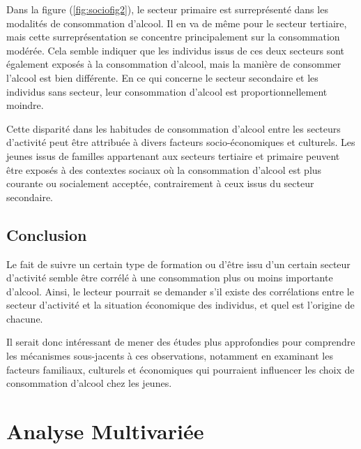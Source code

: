 \documentclass{article}
\begin{document}
Dans la figure (\ref{fig:sociofig2}), le secteur primaire est surreprésenté dans les modalités de consommation d'alcool. Il en va de même pour le secteur tertiaire, mais cette surreprésentation se concentre principalement sur la consommation modérée. Cela semble indiquer que les individus issus de ces deux secteurs sont également exposés à la consommation d'alcool, mais la manière de consommer l'alcool est bien différente. En ce qui concerne le secteur secondaire et les individus sans secteur, leur consommation d'alcool est proportionnellement moindre.

Cette disparité dans les habitudes de consommation d'alcool entre les secteurs d'activité peut être attribuée à divers facteurs socio-économiques et culturels. Les jeunes issus de familles appartenant aux secteurs tertiaire et primaire peuvent être exposés à des contextes sociaux où la consommation d'alcool est plus courante ou socialement acceptée, contrairement à ceux issus du secteur secondaire.

\subsection{Conclusion}
Le fait de suivre un certain type de formation ou d'être issu d'un certain secteur d'activité semble être corrélé à une consommation plus ou moins importante d'alcool. Ainsi, le lecteur pourrait se demander s'il existe des corrélations entre le secteur d'activité et la situation économique des individus, et quel est l'origine de chacune.

Il serait donc intéressant de mener des études plus approfondies pour comprendre les mécanismes sous-jacents à ces observations, notamment en examinant les facteurs familiaux, culturels et économiques qui pourraient influencer les choix de consommation d'alcool chez les jeunes.

\section{Analyse Multivariée}
\end{document}
